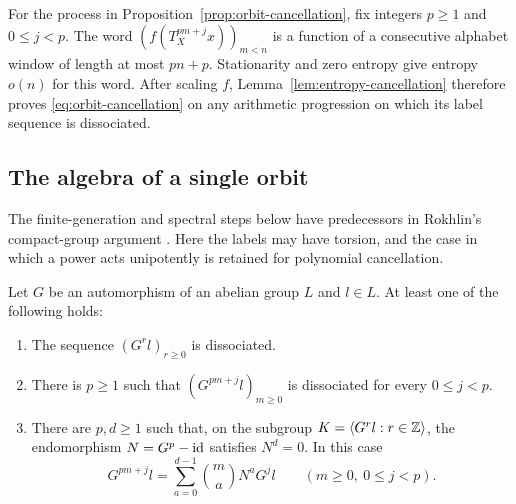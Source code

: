 For the process in Proposition~\ref{prop:orbit-cancellation}, fix integers
$p\ge1$ and $0\le j<p$. The word
$(f(T_X^{pm+j}x))_{m<n}$ is a function of a consecutive alphabet window
of length at most $pn+p$. Stationarity and zero entropy give entropy
$o(n)$ for this word. After scaling $f$, Lemma~\ref{lem:entropy-cancellation}
therefore proves \eqref{eq:orbit-cancellation} on any arithmetic progression
on which its label sequence is dissociated.

\subsection{The algebra of a single orbit}

The finite-generation and spectral steps below have predecessors in
Rokhlin's compact-group argument \cite[Sections~2.3 and~3.2]{Rokhlin1949}.
Here the labels may have torsion, and the case in which a power acts
unipotently is retained for polynomial cancellation.

\begin{lemma}
\label{lem:orbit-alternatives}
Let $G$ be an automorphism of an abelian group $L$ and $l\in L$.
At least one of the following holds:
\begin{enumerate}
\item The sequence $(G^r l)_{r\ge0}$ is dissociated.
\item There is $p\ge1$ such that $(G^{pm+j}l)_{m\ge0}$ is dissociated
      for every $0\le j<p$.
\item There are $p,d\ge1$ such that, on the subgroup
      $K=\langle G^r l:r\in\mathbb Z\rangle$, the endomorphism
      $N=G^p-\operatorname{id}$ satisfies $N^d=0$. In this case
      \begin{equation}
       \label{eq:binomial-orbit}
       G^{pm+j}l
       =\sum_{a=0}^{d-1}\binom ma N^aG^j l
       \qquad(m\ge0,\ 0\le j<p).
      \end{equation}
\end{enumerate}
\end{lemma}

